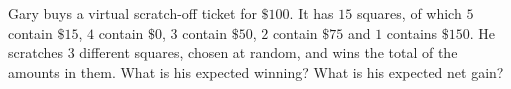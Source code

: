 Gary buys a virtual scratch-off ticket for $\$100$. It has $15$ squares, of which $5$ contain $\$15$, $4$ contain $\$0$, $3$ contain $\$50$, $2$ contain $\$75$ and $1$ contains $\$150$. He scratches $3$ different squares, chosen at random, and wins the total of the amounts in them. What is his expected winning? What is his expected net gain?

